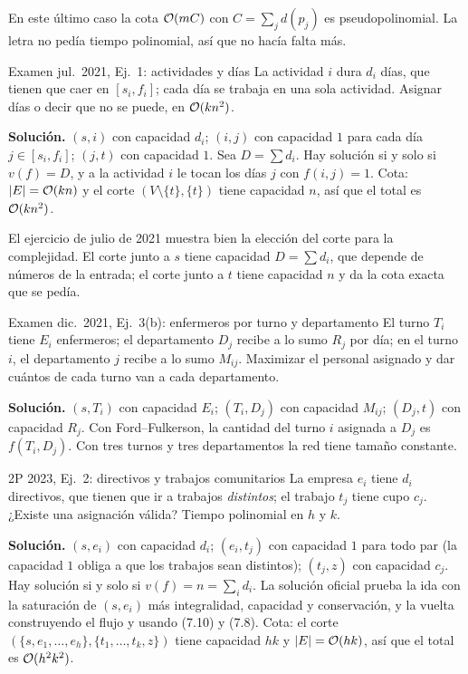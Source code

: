 En este último caso la cota $\mathcal{O}(mC)$ con $C=\sum_j d(p_j)$ es pseudopolinomial. La letra no pedía tiempo polinomial, así que no hacía falta más.

\begin{problema}{Examen jul.~2021, Ej.~1: actividades y días}
La actividad $i$ dura $d_i$ días, que tienen que caer en $[s_i,f_i]$; cada día se trabaja en una sola actividad. Asignar días o decir que no se puede, en $\mathcal{O}(kn^2)$.

\smallskip
\textbf{Solución.} $(s,i)$ con capacidad $d_i$; $(i,j)$ con capacidad $1$ para cada día $j\in[s_i,f_i]$; $(j,t)$ con capacidad $1$. Sea $D=\sum d_i$. Hay solución si y solo si $v(f)=D$, y a la actividad $i$ le tocan los días $j$ con $f(i,j)=1$. Cota: $|E|=\mathcal{O}(kn)$ y el corte $(V\setminus\{t\},\{t\})$ tiene capacidad $n$, así que el total es $\mathcal{O}(kn^2)$.
\end{problema}

El ejercicio de julio de 2021 muestra bien la elección del corte para la complejidad. El corte junto a $s$ tiene capacidad $D=\sum d_i$, que depende de números de la entrada; el corte junto a $t$ tiene capacidad $n$ y da la cota exacta que se pedía.

\begin{problema}{Examen dic.~2021, Ej.~3(b): enfermeros por turno y departamento}
El turno $T_i$ tiene $E_i$ enfermeros; el departamento $D_j$ recibe a lo sumo $R_j$ por día; en el turno $i$, el departamento $j$ recibe a lo sumo $M_{ij}$. Maximizar el personal asignado y dar cuántos de cada turno van a cada departamento.

\smallskip
\textbf{Solución.} $(s,T_i)$ con capacidad $E_i$; $(T_i,D_j)$ con capacidad $M_{ij}$; $(D_j,t)$ con capacidad $R_j$. Con Ford–Fulkerson, la cantidad del turno $i$ asignada a $D_j$ es $f(T_i,D_j)$. Con tres turnos y tres departamentos la red tiene tamaño constante.
\end{problema}

\begin{problema}{2P 2023, Ej.~2: directivos y trabajos comunitarios}
La empresa $e_i$ tiene $d_i$ directivos, que tienen que ir a trabajos \emph{distintos}; el trabajo $t_j$ tiene cupo $c_j$. ¿Existe una asignación válida? Tiempo polinomial en $h$ y $k$.

\smallskip
\textbf{Solución.} $(s,e_i)$ con capacidad $d_i$; $(e_i,t_j)$ con capacidad $1$ para todo par (la capacidad $1$ obliga a que los trabajos sean distintos); $(t_j,z)$ con capacidad $c_j$. Hay solución si y solo si $v(f)=n=\sum_i d_i$. La solución oficial prueba la ida con la saturación de $(s,e_i)$ más integralidad, capacidad y conservación, y la vuelta construyendo el flujo y usando (7.10) y (7.8). Cota: el corte $(\{s,e_1,\dots,e_h\},\{t_1,\dots,t_k,z\})$ tiene capacidad $hk$ y $|E|=\mathcal{O}(hk)$, así que el total es $\mathcal{O}(h^2k^2)$.
\end{problema}

